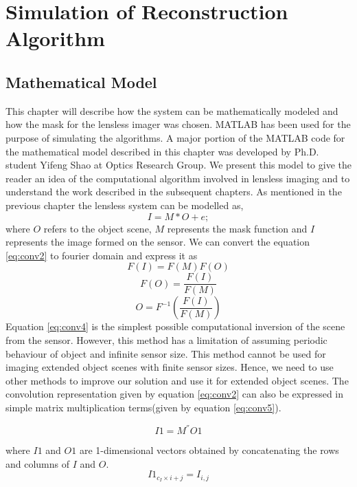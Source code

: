 \chapter{Simulation of Reconstruction Algorithm}
\section{Mathematical Model}
This chapter will describe how the system can be mathematically modeled and how the mask for the lensless imager was chosen. MATLAB has been used for the purpose of simulating the algorithms. A major portion of the MATLAB code for the mathematical model described in this chapter was developed by Ph.D. student Yifeng Shao at Optics Research Group. We present this model to give the reader an idea of the computational algorithm involved in lensless imaging and to understand the work described in the subsequent chapters.
As mentioned in the previous chapter the lensless system can be modelled as,
\begin{equation}
\label{eq:conv2}
I = M * O + e ;
\end{equation}
where $O$ refers to the object scene, $M$ represents the mask function and $I$ represents the image formed on the sensor. We can convert the equation \ref{eq:conv2} to fourier domain and express it as
\begin{equation}
\label{eq:conv3}
F(I) = F(M)F(O)
\end{equation}
\begin{equation}
\label{eq:conv3}
F(O) = \frac{F(I)}{F(M)}
\end{equation}
\begin{equation}
\label{eq:conv4}
O = F^{-1}(\frac{F(I)}{F(M)})
\end{equation}
Equation \ref{eq:conv4} is the simplest possible computational inversion of the scene from the sensor.  However, this method has a limitation of assuming periodic behaviour of object and infinite sensor size. This method cannot be used for imaging extended object scenes with finite sensor sizes. Hence, we need to use other methods to improve our solution and use it for extended object scenes. 
The convolution representation given by equation \ref{eq:conv2} can also be expressed in simple matrix multiplication terms(given by equation \ref{eq:conv5})\cite{Toeplitz}.

\begin{equation}
I1 = M^{''}O1
\label{eq:conv5}
\end{equation} 

where $I1$ and $O1$ are 1-dimensional vectors obtained by concatenating the rows and columns of $I$ and $O$. 
\begin{equation}
I1_{c_I \times i + j} = I_{i, j}
\label{eq:conv6}
\end{equation}


